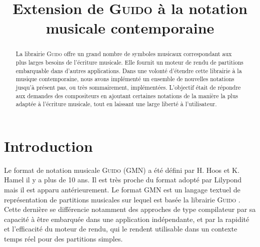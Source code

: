 \documentclass{article}
\title{\centering Extension de \textsc{Guido} à la notation musicale contemporaine}
\begin{document}

\maketitle

\begin{abstract}

La librairie \textsc{Guido} offre un grand nombre de symboles musicaux correspondant aux plus larges besoins de l'écriture musicale. Elle fournit un moteur de rendu de partitions embarquable dans d'autres applications. Dans une volonté d'étendre cette librairie à la musique contemporaine, nous avons implémenté un ensemble de nouvelles notations jusqu'à présent pas, ou très sommairement, implémentées. L'objectif était de répondre aux demandes des compositeurs en ajoutant certaines notations de la manière la plus adaptée à l'écriture musicale, tout en laissant une large liberté à l'utilisateur.

\end{abstract}

\section{Introduction}\label{sec:introduction}

% 


Le format de notation musicale \textsc{Guido} (GMN) \cite{ref6} \cite{ref5} a été défini par H. Hoos et K. Hamel il y a plus de 10 ans. Il est très proche du format adopté par Lilypond \cite{ref7} mais il est apparu antérieurement. Le format GMN est un langage textuel de représentation de partitions musicales %
sur lequel est basée %
la librairie \textsc{Guido} \cite{ref5}. Cette dernière %
se différencie notamment des approches de type compilateur par sa capacité à être embarquée dans une application indépendante, et par la rapidité et l'efficacité du moteur de rendu, qui le rendent utilisable dans un contexte temps réel pour des partitions simples.
\end{document}

